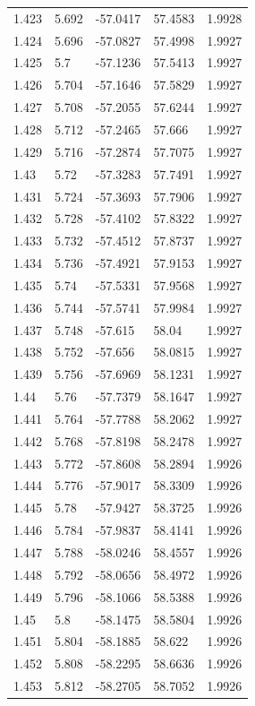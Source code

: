 \begin{tabular}{lllll}
1.423 & 5.692 & -57.0417 & 57.4583 & 1.9928 \\
1.424 & 5.696 & -57.0827 & 57.4998 & 1.9927 \\
1.425 & 5.7 & -57.1236 & 57.5413 & 1.9927 \\
1.426 & 5.704 & -57.1646 & 57.5829 & 1.9927 \\
1.427 & 5.708 & -57.2055 & 57.6244 & 1.9927 \\
1.428 & 5.712 & -57.2465 & 57.666 & 1.9927 \\
1.429 & 5.716 & -57.2874 & 57.7075 & 1.9927 \\
1.43 & 5.72 & -57.3283 & 57.7491 & 1.9927 \\
1.431 & 5.724 & -57.3693 & 57.7906 & 1.9927 \\
1.432 & 5.728 & -57.4102 & 57.8322 & 1.9927 \\
1.433 & 5.732 & -57.4512 & 57.8737 & 1.9927 \\
1.434 & 5.736 & -57.4921 & 57.9153 & 1.9927 \\
1.435 & 5.74 & -57.5331 & 57.9568 & 1.9927 \\
1.436 & 5.744 & -57.5741 & 57.9984 & 1.9927 \\
1.437 & 5.748 & -57.615 & 58.04 & 1.9927 \\
1.438 & 5.752 & -57.656 & 58.0815 & 1.9927 \\
1.439 & 5.756 & -57.6969 & 58.1231 & 1.9927 \\
1.44 & 5.76 & -57.7379 & 58.1647 & 1.9927 \\
1.441 & 5.764 & -57.7788 & 58.2062 & 1.9927 \\
1.442 & 5.768 & -57.8198 & 58.2478 & 1.9927 \\
1.443 & 5.772 & -57.8608 & 58.2894 & 1.9926 \\
1.444 & 5.776 & -57.9017 & 58.3309 & 1.9926 \\
1.445 & 5.78 & -57.9427 & 58.3725 & 1.9926 \\
1.446 & 5.784 & -57.9837 & 58.4141 & 1.9926 \\
1.447 & 5.788 & -58.0246 & 58.4557 & 1.9926 \\
1.448 & 5.792 & -58.0656 & 58.4972 & 1.9926 \\
1.449 & 5.796 & -58.1066 & 58.5388 & 1.9926 \\
1.45 & 5.8 & -58.1475 & 58.5804 & 1.9926 \\
1.451 & 5.804 & -58.1885 & 58.622 & 1.9926 \\
1.452 & 5.808 & -58.2295 & 58.6636 & 1.9926 \\
1.453 & 5.812 & -58.2705 & 58.7052 & 1.9926 \\

\end{tabular}
